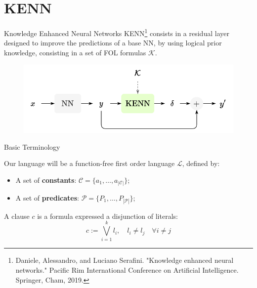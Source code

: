 \documentclass{beamer}
\begin{document}
	\section{KENN}

	\begin{frame}{Knowledge Enhanced Neural Networks}
		KENN\footnote{Daniele, Alessandro, and Luciano Serafini. "Knowledge enhanced neural networks." Pacific Rim International Conference on Artificial Intelligence. Springer, Cham, 2019.\vspace{20pt}} consists in a residual layer designed to improve the predictions of a base NN, by using logical prior knowledge, consisting in a set of FOL formulas $\mathcal{K}$.
		\begin{figure}
			\centering
			\includegraphics[width=0.95\linewidth]{images/kenn_intuition.pdf}
			
		\end{figure}
	\end{frame}

\begin{frame}{Basic Terminology}
	\begin{definition}
		Our language will be a function-free first order language $\mathcal{L}$, defined by:
		\begin{itemize}
			\item A set of \textbf{constants}: $\mathcal{C}=\{a_1,\dots,a_{|\mathcal{C}|}\}$;
			\item A set of \textbf{predicates}: $\mathcal{P}=\{P_1,\dots,P_{|\mathcal{P}|}\}$;
		\end{itemize}
	\end{definition}

	
	\begin{definition}[Clause]
		A clause $c$ is a formula expressed a disjunction of literals:
		\begin{equation*}
		c:=\bigvee_{i=1}^{k} l_{i}, \quad l_{i} \neq l_{j} \quad \forall i \neq j
		\end{equation*}
	\end{definition}
\end{frame}
\end{document}
